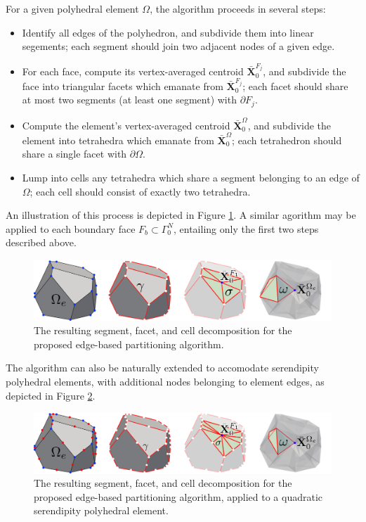 	For a given polyhedral element $\Omega$, the algorithm proceeds in several steps:
	\begin{itemize}
		\item[1.)] Identify all edges of the polyhedron, and subdivide them into linear segements; each segment should join two adjacent nodes of a given edge.
		\item[2.)] For each face, compute its vertex-averaged centroid $\bar{\mathbf{X}}^{F_j}_0$, and subdivide the face into triangular facets which emanate from $\bar{\mathbf{X}}^{F_j}_0$; each facet should share at most two segments (at least one segment) with $\partial F_j$.
		\item[3a.)] Compute the element's vertex-averaged centroid $\bar{\mathbf{X}}^{\Omega}_0$, and subdivide the element into tetrahedra which emanate from $\bar{\mathbf{X}}^{\Omega}_0$; each tetrahedron should share a single facet with $\partial \Omega$.
		\item[3b.)] Lump into cells any tetrahedra which share a segment belonging to an edge of $\Omega$; each cell should consist of exactly two tetrahedra.
	\end{itemize}
	An illustration of this process is depicted in Figure \ref{fig:partitioning_algorithm}. A similar agorithm may be applied to each boundary face $F_b \subset \Gamma^N_0$, entailing only the first two steps described above.
	\begin{figure} [!ht]
		\centering
		\includegraphics[width = 6.0in]{figures/partitioning_algorithm.pdf}
		\caption{The resulting segment, facet, and cell decomposition for the proposed edge-based partitioning algorithm.}
		\label{fig:partitioning_algorithm}
	\end{figure}
	
	The algorithm can also be naturally extended to accomodate serendipity polyhedral elements, with additional nodes belonging to element edges, as depicted in Figure \ref{fig:partitioning_algorithm_quadratic}.
	\begin{figure} [!ht]
		\centering
		\includegraphics[width = 6.0in]{figures/partitioning_algorithm_quadratic.pdf}
		\caption{The resulting segment, facet, and cell decomposition for the proposed edge-based partitioning algorithm, applied to a quadratic serendipity polyhedral element.}
		\label{fig:partitioning_algorithm_quadratic}
	\end{figure}
	
